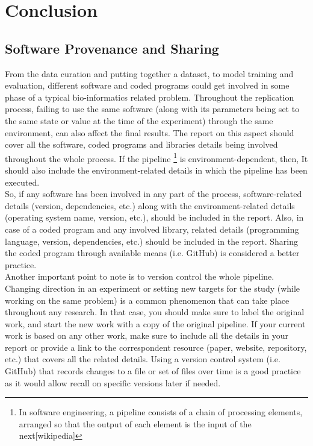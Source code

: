 \section {Conclusion}

\subsection{Software Provenance and Sharing}
    \label{sec:softwareProvenance}

    From the data curation and putting together a dataset, to model training and evaluation, different software and coded programs 
    could get involved in some phase of a typical bio-informatics related problem. 
    Throughout the replication process, failing to use the same software (along with its parameters 
    being set to the same state or value at the time of the experiment) through the same environment, can also affect the final results. 
    The report on this aspect should cover all the software, coded programs and libraries details being involved throughout the whole process. 
    If the pipeline \footnote{In software engineering, a pipeline consists of a chain of processing elements, 
    arranged so that the output of each element is the input of the next[wikipedia]} is environment-dependent, then,  It should also include the environment-related 
    details in which the pipeline has been executed.\\

    So, if any software has been involved in any part of the process, software-related details (version, dependencies, etc.) along 
    with the environment-related details (operating system name, version, etc.), should be included in the report.
    Also, in case of a coded program and any involved library, related details (programming language, version, dependencies, etc.) 
    should be included in the report. Sharing the coded program through available means (i.e. GitHub) is considered a better practice.\\

    Another important point to note is to version control the whole pipeline. Changing direction in an experiment or setting new targets 
    for the study (while working on the same problem) is a common phenomenon that can take place throughout any research. 
    In that case, you should make sure to label the original work, and start the new work with a copy of the original pipeline. If your 
    current work is based on any other work, make sure to include all the details in your report or provide a link to the correspondent 
    resource (paper, website, repository, etc.) that covers all the related details. Using a version control system (i.e. GitHub) 
    that records changes to a file or set of files over time is a good practice as it would allow recall on specific versions 
    later if needed.\\
    

